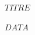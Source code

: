 \documentclass[a4paper,10pt]{book}
\begin{document}
\begin{center}
    \Large $TITRE$
\end{center}

$DATA$
\end{document}
